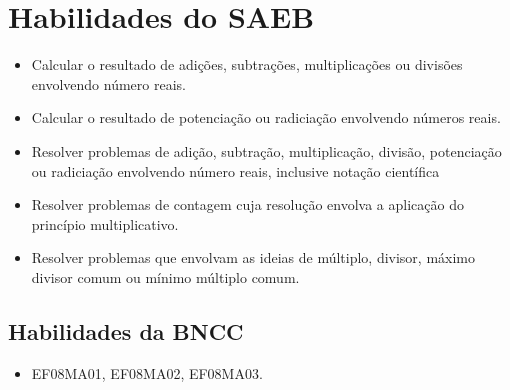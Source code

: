 \section{Habilidades do SAEB}

\begin{itemize}
  \item Calcular o resultado de adições, subtrações,
multiplicações ou divisões envolvendo número reais.
\item
  Calcular o resultado de potenciação ou radiciação envolvendo números
  reais.
\item
  Resolver problemas de adição, subtração, multiplicação, divisão,
  potenciação ou radiciação envolvendo número reais, inclusive notação
  científica
\item
  Resolver problemas de contagem cuja resolução envolva a aplicação do
  princípio multiplicativo.
\item
  Resolver problemas que envolvam as ideias de múltiplo, divisor, máximo
  divisor comum ou mínimo múltiplo comum.
\end{itemize}

\subsection{Habilidades da BNCC}

\begin{itemize}
\item EF08MA01, EF08MA02, EF08MA03.
\end{itemize}

